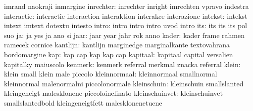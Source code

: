                            imrand                    naokraji
                           inmargine
                inrechter: inrechter                 inright
                           imrechten                 vpravo
                           indestra
               interactie: interactie                interaction
                           interaktion               interakce
                           interazione
                  intekst: intekst                   intext
                           imtext                    dotextu
                           intesto
                    intro: intro                     intro
                           intro                     uvod
                           intro
                      its: its                       its
                           its                       pol
                           suo
                       ja: ja                        yes
                           ja                        ano
                           si
                     jaar: jaar                      year
                           jahr                      rok
                           anno
                    kader: kader                     frame
                           rahmen                    ramecek
                           cornice
                 kantlijn: kantlijn                  marginedge
                           marginalkante             textovahrana
                           bordomargine
                      kap: kap                       cap
                           kap                       kap
                           cap                       %
                 kapitaal: kapitaal                  capital
                           versalien                 kapitalky
                           maiuscolo
                  kenmerk: kenmerk                   referral
                           merkmal                   znacka
                           referral                  %
                    klein: klein                     small
                           klein                     male
                           piccolo
             kleinnormaal: kleinnormaal              smallnormal
                           kleinnormal               malenormalni
                           piccolonormale
              kleinschuin: kleinschuin               smallslanted
                           kleingeneigt              malesklonene
                           piccoloinclinato
           kleinschuinvet: kleinschuinvet            smallslantedbold
                           kleingeneigtfett          malesklonenetucne
